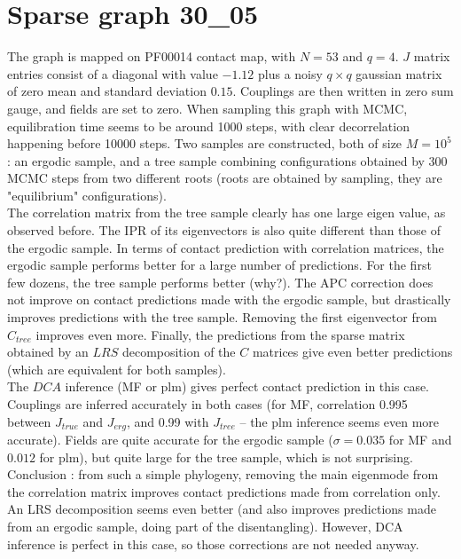 \documentclass[10pt]{article}
\begin{document}
\section{Sparse graph 30_05} %
\label{sec:sparse_graph_30_05}

The graph is mapped on PF00014 contact map, with $N = 53$ and $q=4$. $J$ matrix entries consist of a diagonal with value $-1.12$ plus a noisy $q\times q$ gaussian matrix of zero mean and standard deviation $0.15$. Couplings are then written in zero sum gauge, and fields are set to zero. When sampling this  graph with MCMC, equilibration time seems to be around 1000 steps, with clear decorrelation happening before 10000 steps. Two samples are constructed, both of size $M=10^5$ : an ergodic sample, and a tree sample combining configurations obtained by 300 MCMC steps from two different roots (roots are obtained by sampling, they are "equilibrium" configurations). \\

The correlation matrix from the tree sample clearly has one large eigen value, as observed before. The IPR of its eigenvectors is also quite different than those of the ergodic sample. In terms of contact prediction with correlation matrices, the ergodic sample performs better for a large number of predictions. For the first few dozens, the tree sample performs better (why?). The APC correction does not improve on contact predictions made with the ergodic sample, but drastically improves predictions with the tree sample. Removing the first eigenvector from $C_{tree}$ improves even more. Finally, the predictions from the sparse matrix obtained by an $LRS$ decomposition of the $C$ matrices give even better predictions (which are equivalent for both samples). \\
The $DCA$ inference (MF or plm) gives perfect contact prediction in this case. Couplings are inferred accurately in both cases (for MF, correlation 0.995 between $J_{true}$ and $J_{erg}$, and 0.99 with $J_{tree}$ -- the plm inference seems even more accurate). Fields are quite accurate for the ergodic sample ($\sigma = 0.035$ for MF and $0.012$ for plm), but quite large for the tree sample, which is not surprising. \\

Conclusion : from such a simple phylogeny, removing the main eigenmode from the correlation matrix improves contact predictions made from correlation only. An LRS decomposition seems even better (and also improves predictions made from an ergodic sample, doing part of the disentangling). However, DCA inference is perfect in this case, so those corrections are not needed anyway.\\
\end{document}
